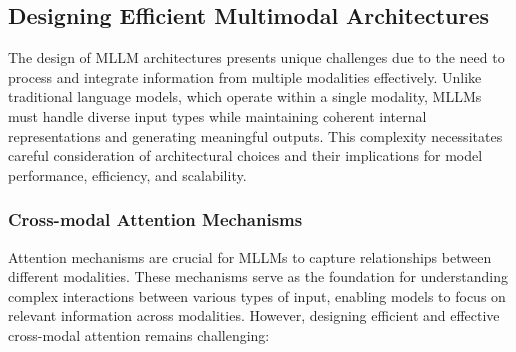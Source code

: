 \subsection{Designing Efficient Multimodal Architectures}
The design of MLLM architectures presents unique challenges due to the need to process and integrate information from multiple modalities effectively. Unlike traditional language models, which operate within a single modality, MLLMs must handle diverse input types while maintaining coherent internal representations and generating meaningful outputs. This complexity necessitates careful consideration of architectural choices and their implications for model performance, efficiency, and scalability.


\subsubsection{Cross-modal Attention Mechanisms}
Attention mechanisms are crucial for MLLMs to capture relationships between different modalities. These mechanisms serve as the foundation for understanding complex interactions between various types of input, enabling models to focus on relevant information across modalities. However, designing efficient and effective cross-modal attention remains challenging:

